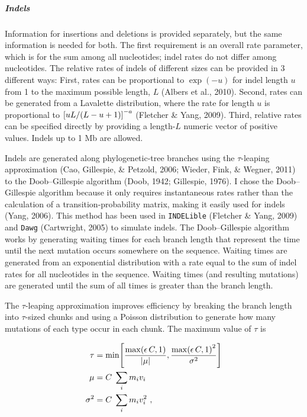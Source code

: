 \documentclass[12pt,]{article}
\let\oldsubparagraph\subparagraph
\renewcommand{\subparagraph}[1]{\oldsubparagraph{#1}\mbox{}}
\let\originalleft\left
\let\originalright\right
\renewcommand{\left}{\mathopen{}\mathclose\bgroup\originalleft}
\renewcommand{\right}{\aftergroup\egroup\originalright}
\begin{document}
\hypertarget{indels}{%
\subparagraph{Indels}\label{indels}}

Information for insertions and deletions is provided separately, but
the same information is needed for both.
The first requirement is an overall rate parameter, which is for the sum among all
nucleotides; indel rates do not differ among nucleotides.
The relative rates of indels of different sizes can be provided in 3 different ways:
First, rates can be proportional to \(\exp(-u)\) for indel length \(u\) from
1 to the maximum possible length, \(L\) (Albers et al., 2010).
Second, rates can be generated from a Lavalette distribution,
where the rate for length \(u\) is proportional to
\(\left[{u L / (L - u + 1)}\right]^{-a}\) (Fletcher \& Yang, 2009).
Third, relative rates can be specified directly by providing a length-\(L\)
numeric vector of positive values.
Indels up to 1 Mb are allowed.

Indels are generated along phylogenetic-tree branches using
the \(\tau\)-leaping approximation (Cao, Gillespie, \& Petzold, 2006; Wieder, Fink, \& Wegner, 2011) to the
Doob--Gillespie algorithm (Doob, 1942; Gillespie, 1976).
I chose the Doob--Gillespie algorithm because it only requires instantaneous rates
rather than the calculation of a transition-probability matrix, making it easily used
for indels (Yang, 2006).
This method has been used in \texttt{INDELible} (Fletcher \& Yang, 2009) and \texttt{Dawg} (Cartwright, 2005)
to simulate indels.
The Doob--Gillespie algorithm works by generating waiting times for each branch
length that represent the time until the next mutation occurs somewhere on the sequence.
Waiting times are generated from an exponential distribution with a rate equal to the
sum of indel rates for all nucleotides in the sequence.
Waiting times (and resulting mutations) are generated until the sum of all times
is greater than the branch length.

The \(\tau\)-leaping approximation improves efficiency by breaking the branch length
into \(\tau\)-sized chunks and using a Poisson distribution to generate how many
mutations of each type occur in each chunk.
The maximum value of \(\tau\) is

\begin{align*}
\tau &= \min \left[ \frac { \max \left( \epsilon \, C, 1 \right) } { | \mu | }, \frac { \max \left( \epsilon \, C, 1 \right)^2 } { \sigma^2 } \right] \\
\mu &= C \; \sum_i{ m_i v_i } \\
\sigma^2 &= C \; \sum_i{ m_i v_i^2 } ~ \rlap{,}
\end{align*}
\end{document}
